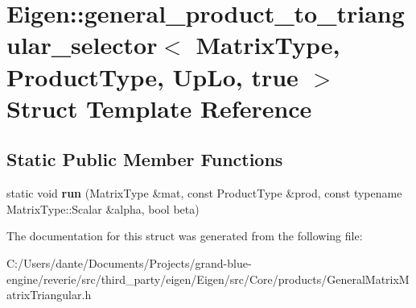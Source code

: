 \hypertarget{struct_eigen_1_1general__product__to__triangular__selector_3_01_matrix_type_00_01_product_type_00_01_up_lo_00_01true_01_4}{}\section{Eigen\+::general\+\_\+product\+\_\+to\+\_\+triangular\+\_\+selector$<$ Matrix\+Type, Product\+Type, Up\+Lo, true $>$ Struct Template Reference}
\label{struct_eigen_1_1general__product__to__triangular__selector_3_01_matrix_type_00_01_product_type_00_01_up_lo_00_01true_01_4}
\subsection*{Static Public Member Functions}
\begin{DoxyCompactItemize}
\item 
\mbox{\label{struct_eigen_1_1general__product__to__triangular__selector_3_01_matrix_type_00_01_product_type_00_01_up_lo_00_01true_01_4_a3102a63fe7b1c0bfaa90b2acf9fa025f}} 
static void {\bfseries run} (Matrix\+Type \&mat, const Product\+Type \&prod, const typename Matrix\+Type\+::\+Scalar \&alpha, bool beta)
\end{DoxyCompactItemize}


The documentation for this struct was generated from the following file\+:\begin{DoxyCompactItemize}
\item 
C\+:/\+Users/dante/\+Documents/\+Projects/grand-\/blue-\/engine/reverie/src/third\+\_\+party/eigen/\+Eigen/src/\+Core/products/General\+Matrix\+Matrix\+Triangular.\+h\end{DoxyCompactItemize}
